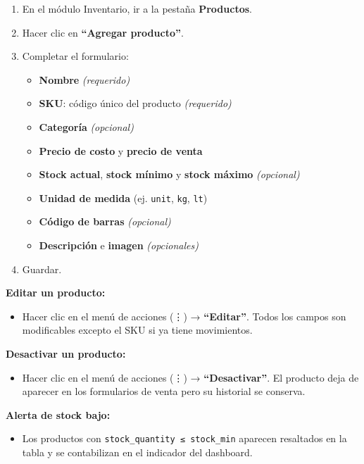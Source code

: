 \begin{enumerate}
\def\labelenumi{\arabic{enumi}.}
\tightlist
\item
  En el módulo Inventario, ir a la pestaña \textbf{Productos}.
\item
  Hacer clic en \textbf{``Agregar producto''}.
\item
  Completar el formulario:

  \begin{itemize}
  \tightlist
  \item
    \textbf{Nombre} \emph{(requerido)}
  \item
    \textbf{SKU}: código único del producto \emph{(requerido)}
  \item
    \textbf{Categoría} \emph{(opcional)}
  \item
    \textbf{Precio de costo} y \textbf{precio de venta}
  \item
    \textbf{Stock actual}, \textbf{stock mínimo} y \textbf{stock máximo} \emph{(opcional)}
  \item
    \textbf{Unidad de medida} (ej. \texttt{unit}, \texttt{kg}, \texttt{lt})
  \item
    \textbf{Código de barras} \emph{(opcional)}
  \item
    \textbf{Descripción} e \textbf{imagen} \emph{(opcionales)}
  \end{itemize}
\item
  Guardar.
\end{enumerate}

\textbf{Editar un producto:}

\begin{itemize}
\tightlist
\item
  Hacer clic en el menú de acciones (⋮) → \textbf{``Editar''}. Todos los campos son modificables excepto el SKU si ya tiene movimientos.
\end{itemize}

\textbf{Desactivar un producto:}

\begin{itemize}
\tightlist
\item
  Hacer clic en el menú de acciones (⋮) → \textbf{``Desactivar''}. El producto deja de aparecer en los formularios de venta pero su historial se conserva.
\end{itemize}

\textbf{Alerta de stock bajo:}

\begin{itemize}
\tightlist
\item
  Los productos con \texttt{stock\_quantity\ ≤\ stock\_min} aparecen resaltados en la tabla y se contabilizan en el indicador del dashboard.
\end{itemize}

